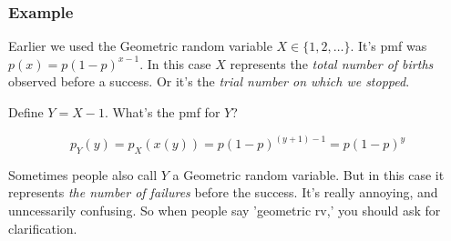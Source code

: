\documentclass{beamer}
\begin{document}

\begin{frame}
\frametitle{Example}

Earlier we used the Geometric random variable $X \in \{1, 2, \ldots\}$. It's pmf was $p(x) = p(1-p)^{x-1}$. In this case $X$ represents the \emph{total number of births} observed before a success. Or it's the \emph{trial number on which we stopped}. 
\newline

Define $Y = X-1$. What's the pmf for $Y$?
\pause

\[
p_Y(y) = p_X(x(y)) = p(1-p)^{(y+1)-1} = p(1-p)^{y}
\]

Sometimes people also call $Y$ a Geometric random variable. But in this case it represents \emph{the number of failures} before the success. It's really annoying, and unncessarily confusing. So when people say 'geometric rv,' you should ask for clarification. 
\end{frame}

\end{document}
